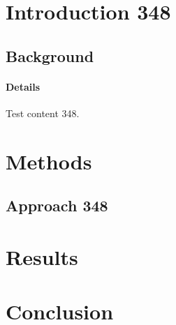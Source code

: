 \documentclass{article}
\begin{document}
\section{Introduction 348}
\subsection{Background}
\paragraph{Details} Test content 348.
\section{Methods}
\subsection{Approach 348}
\section{Results}
\section{Conclusion}
\end{document}

